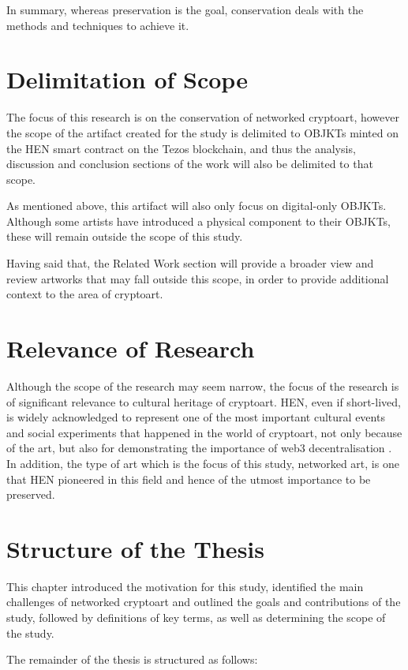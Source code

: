 \vspace{0.5cm}

In summary, whereas preservation is the goal, conservation deals with the methods and techniques to achieve it.

\section{Delimitation of Scope}

The focus of this research is on the conservation of networked cryptoart, however the scope of the artifact created for the study is delimited to OBJKTs minted on the HEN smart contract on the Tezos blockchain, and thus the analysis, discussion and conclusion sections of the work will also be delimited to that scope.

As mentioned above, this artifact will also only focus on digital-only OBJKTs. Although some artists have introduced a physical component to their OBJKTs, these will remain outside the scope of this study.

Having said that, the Related Work section will provide a broader view and review artworks that may fall outside this scope, in order to provide additional context to the area of cryptoart.

\section{Relevance of Research}

Although the scope of the research may seem narrow, the focus of the research is of significant relevance to cultural heritage of cryptoart.
HEN, even if short-lived, is widely acknowledged to represent one of the most important cultural events and social experiments that happened in the world of cryptoart, not only because of the art, but also for demonstrating the importance of web3 decentralisation \cite{rcsEarlyDaysHic2023} \cite{baileyHicNuncBrings2021} \cite{drubayHowHicNunc2021}.
In addition, the type of art which is the focus of this study, networked art, is one that HEN pioneered in this field and hence of the utmost importance to be preserved.

\section{Structure of the Thesis}

This chapter introduced the motivation for this study, identified the main challenges of networked cryptoart and outlined the goals and contributions of the study, followed by definitions of key terms, as well as determining the scope of the study.

The remainder of the thesis is structured as follows:


\todo

